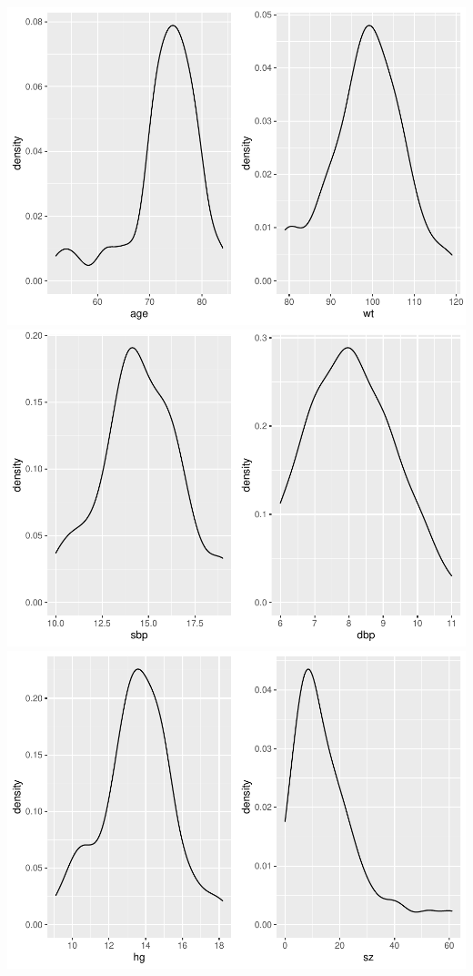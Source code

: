 \documentclass[
]{article}
\begin{document}
\includegraphics{clustering_files/figure-latex/unnamed-chunk-26-1.pdf}
\includegraphics{clustering_files/figure-latex/unnamed-chunk-26-2.pdf}
\includegraphics{clustering_files/figure-latex/unnamed-chunk-26-3.pdf}
\end{document}
